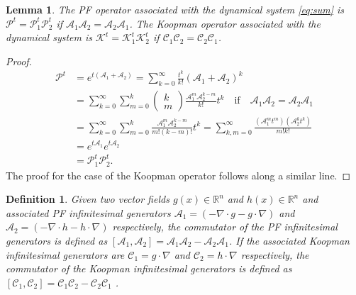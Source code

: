 \documentclass[pdflatex,sn-mathphys]{sn-jnl}%
\newtheorem{lemma}{Lemma}
\newtheorem{defn}{Definition}
\theoremstyle{thmstyleone}%
\theoremstyle{thmstyletwo}%
\theoremstyle{thmstylethree}%
\begin{document}
\begin{lemma}
The PF operator associated with the dynamical system \eqref{eq:sum} is $\mathcal{P}^t = \mathcal{P}_1^t\mathcal{P}_2^t$  if $\mathcal{A}_1\mathcal{A}_2 = \mathcal{A}_2\mathcal{A}_1$. The Koopman operator associated with the dynamical system is $\mathcal{K}^t = \mathcal{K}_1^t\mathcal{K}_2^t$  if $\mathcal{C}_1\mathcal{C}_2 = \mathcal{C}_2\mathcal{C}_1$.
\end{lemma}
\begin{proof}
\[
\begin{split}
\mathcal{P}^t &= e^{t(\mathcal{A}_1+\mathcal{A}_2)} = \sum_{k=0}^{\infty}\frac{t^k}{k!}(\mathcal{A}_1+\mathcal{A}_2)^k \\
 &=  \sum_{k=0}^{\infty}\sum_{m=0}^{k}\begin{pmatrix}k\\m \end{pmatrix}\frac{\mathcal{A}_1^m\mathcal{A}_2^{k-m}}{k!}t^k \quad \textrm{if} \quad \mathcal{A}_1\mathcal{A}_2 = \mathcal{A}_2\mathcal{A}_1 \\
 &=\sum_{k=0}^{\infty}\sum_{m=0}^{k}\frac{\mathcal{A}_1^m\mathcal{A}_2^{k-m}}{m!(k-m)!}t^k = \sum_{k,m=0}^{\infty}\frac{(\mathcal{A}_1^mt^m)(\mathcal{A}_2^{k}t^k)}{m!k!}\\
 &=e^{t\mathcal{A}_1}e^{t\mathcal{A}_2}\\
 &=\mathcal{P}_1^t\mathcal{P}_2^t.
\end{split}
\]
The proof for the case of the Koopman operator follows along a similar line.
\end{proof}

\begin{defn}
Given two vector fields $g(x) \in \mathbb{R}^n$ and $h(x) \in \mathbb{R}^n$ and associated PF infinitesimal generators $\mathcal{A}_1 = (-\nabla \cdot g - g \cdot \nabla)$ and $\mathcal{A}_2 = (-\nabla \cdot h - h \cdot \nabla)$ respectively, the commutator  of the PF infinitesimal generators is defined as $[\mathcal{A}_1,\mathcal{A}_2] =\mathcal{A}_1\mathcal{A}_2 - \mathcal{A}_2\mathcal{A}_1$. If the associated Koopman infinitesimal generators are $\mathcal{C}_1 =  g \cdot \nabla$ and $\mathcal{C}_2 =  h \cdot \nabla$ respectively, the commutator  of the Koopman infinitesimal generators is defined as $[\mathcal{C}_1,\mathcal{C}_2] =\mathcal{C}_1\mathcal{C}_2 - \mathcal{C}_2\mathcal{C}_1$ .
\end{defn}
\end{document}
